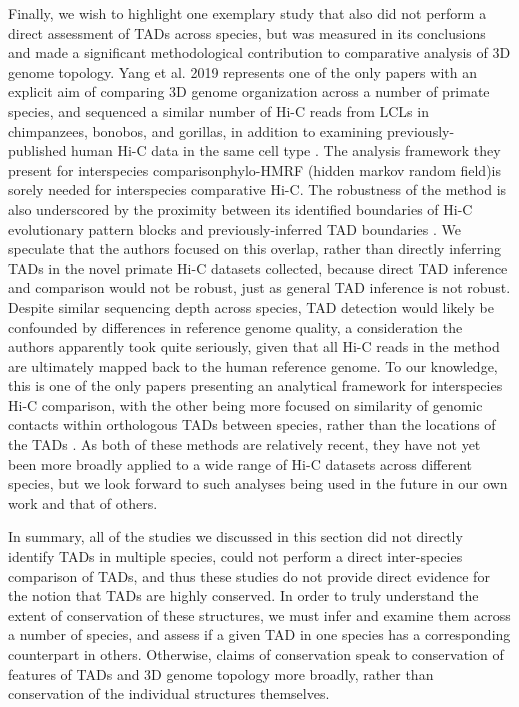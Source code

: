 Finally, we wish to highlight one exemplary study that also did not perform a direct assessment of TADs across species, but was measured in its conclusions and made a significant methodological contribution to comparative analysis of 3D genome topology. Yang et al. 2019 \cite{Yang.2019} represents one of the only papers with an explicit aim of comparing 3D genome organization across a number of primate species, and sequenced a similar number of Hi-C reads from LCLs in chimpanzees, bonobos, and gorillas, in addition to examining previously-published human Hi-C data in the same cell type \cite{Rao.2014}. The analysis framework they present for interspecies comparison\emdash phylo-HMRF (hidden markov random field)\emdash is sorely needed for interspecies comparative Hi-C.  The robustness of the method is also underscored by the proximity between its identified boundaries of Hi-C evolutionary pattern blocks and previously-inferred TAD boundaries \cite{Rao.2014}. We speculate that the authors focused on this overlap, rather than directly inferring TADs in the novel primate Hi-C datasets collected, because direct TAD inference and comparison would not be robust, just as general TAD inference is not robust. Despite similar sequencing depth across species, TAD detection would likely be confounded by differences in reference genome quality, a consideration the authors apparently took quite seriously, given that all Hi-C reads in the method are ultimately mapped back to the human reference genome. To our knowledge, this is one of the only papers presenting an analytical framework for interspecies Hi-C comparison, with the other being more focused on similarity of genomic contacts within orthologous TADs between species, rather than the locations of the TADs  \cite{Nuriddinov.2019}. As both of these methods are relatively recent,  they have not yet been more broadly applied to a wide range of Hi-C datasets across different species, but we look forward to such analyses being used in the future in our own work and that of others.

In summary, all of the studies we discussed in this section did not directly identify TADs in multiple species, could not perform a direct inter-species comparison of TADs, and thus these studies do not provide direct evidence for the notion that TADs are highly conserved. In order to truly understand the extent of conservation of these structures, we must infer and examine them across a number of species, and assess if a given TAD in one species has a corresponding counterpart in others. Otherwise, claims of conservation speak to conservation of features of TADs and 3D genome topology more broadly, rather than conservation of the individual structures themselves.

